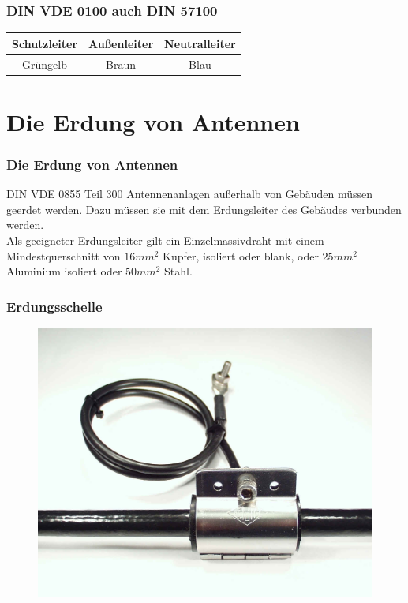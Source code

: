 \begin{frame}
  \frametitle{DIN VDE 0100 auch DIN 57100}
  \begin{center} \large
    \begin{tabular}{c|c|c}
      Schutzleiter & Außenleiter & Neutralleiter \\ \hline \hline
      Grüngelb & Braun & Blau \\
    \end{tabular}
  \end{center}
\end{frame}

\section*{Die Erdung von Antennen}

\begin{frame}
  \frametitle{Die Erdung von Antennen}
  \begin{center}
    \begin{block}{DIN VDE 0855 Teil 300}
      Antennenanlagen außerhalb von Gebäuden müssen geerdet werden. Dazu müssen sie mit dem Erdungsleiter des Gebäudes verbunden werden. \\
      Als geeigneter Erdungsleiter gilt ein Einzelmassivdraht mit einem Mindestquerschnitt von $16 mm^2$ Kupfer, isoliert oder blank, oder $25 mm^2$ Aluminium isoliert oder $50 mm^2$ Stahl.
    \end{block}
  \end{center}
\end{frame}

\begin{frame}
  \frametitle{Erdungsschelle}
  \begin{center}
    \begin{figure}
      \includegraphics[width=\textwidth,height=0.75\textheight,keepaspectratio]{a19/AntenneErden.jpg}
    \end{figure}
  \end{center}
\end{frame}

